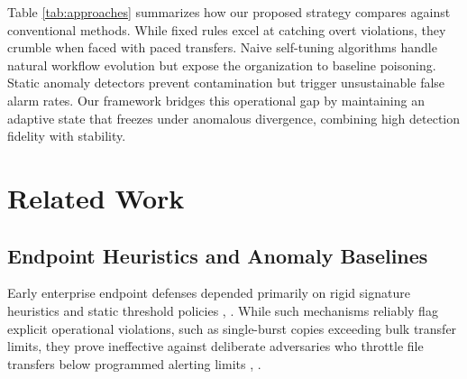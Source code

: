 \documentclass[conference]{IEEEtran}
\begin{document}
\begin{table}[htbp]
\caption{Qualitative Comparison of Detection Approaches}
\label{tab:approaches}
\centering
{}
\end{table}

Table \ref{tab:approaches} summarizes how our proposed strategy compares against conventional methods. While fixed rules excel at catching overt violations, they crumble when faced with paced transfers. Naive self-tuning algorithms handle natural workflow evolution but expose the organization to baseline poisoning. Static anomaly detectors prevent contamination but trigger unsustainable false alarm rates. Our framework bridges this operational gap by maintaining an adaptive state that freezes under anomalous divergence, combining high detection fidelity with stability.

\section{Related Work}

\subsection{Endpoint Heuristics and Anomaly Baselines}
Early enterprise endpoint defenses depended primarily on rigid signature heuristics and static threshold policies \cite{b3}, \cite{b4}. While such mechanisms reliably flag explicit operational violations, such as single-burst copies exceeding bulk transfer limits, they prove ineffective against deliberate adversaries who throttle file transfers below programmed alerting limits \cite{b8}, \cite{b9}.
\end{document}
